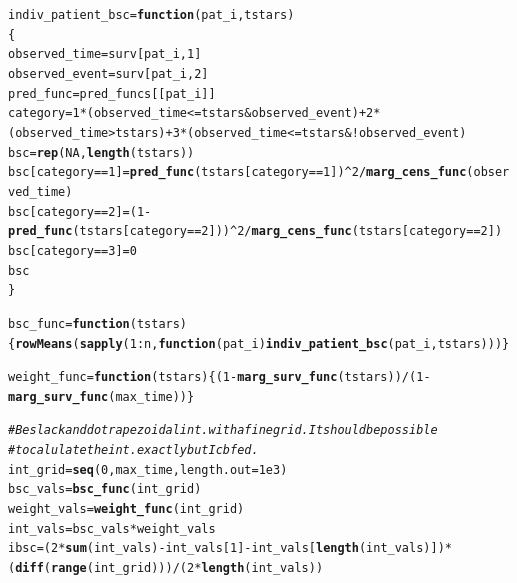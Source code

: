 \documentclass{article}\usepackage[]{graphicx}\usepackage[]{color}
\makeatletter
\newcommand{\hlnum}[1]{\textcolor[rgb]{0.686,0.059,0.569}{#1}}%
\newcommand{\hlcom}[1]{\textcolor[rgb]{0.678,0.584,0.686}{\textit{#1}}}%
\newcommand{\hlopt}[1]{\textcolor[rgb]{0,0,0}{#1}}%
\newcommand{\hlstd}[1]{\textcolor[rgb]{0.345,0.345,0.345}{#1}}%
\newcommand{\hlkwa}[1]{\textcolor[rgb]{0.161,0.373,0.58}{\textbf{#1}}}%
\newcommand{\hlkwb}[1]{\textcolor[rgb]{0.69,0.353,0.396}{#1}}%
\newcommand{\hlkwc}[1]{\textcolor[rgb]{0.333,0.667,0.333}{#1}}%
\newcommand{\hlkwd}[1]{\textcolor[rgb]{0.737,0.353,0.396}{\textbf{#1}}}%
\newenvironment{kframe}{%
 \def\at@end@of@kframe{}%
 \ifinner\ifhmode%
  \def\at@end@of@kframe{\end{minipage}}%
  \begin{minipage}{\columnwidth}%
 \fi\fi%
 \def\FrameCommand##1{\hskip\@totalleftmargin \hskip-\fboxsep
 \colorbox{shadecolor}{##1}\hskip-\fboxsep
     \hskip-\linewidth \hskip-\@totalleftmargin \hskip\columnwidth}%
 \MakeFramed {\advance\hsize-\width
   \@totalleftmargin\z@ \linewidth\hsize
   \@setminipage}}%
 {\par\unskip\endMakeFramed%
 \at@end@of@kframe}
\newenvironment{knitrout}{}{} %
\makeatother
\begin{document}
\begin{knitrout}
\begin{kframe}
\begin{alltt}
        \hlstd{indiv_patient_bsc} \hlkwb{=} \hlkwa{function}\hlstd{(}\hlkwc{pat_i}\hlstd{,} \hlkwc{tstars}\hlstd{)}
        \hlstd{\{}
                \hlstd{observed_time} \hlkwb{=} \hlstd{surv[pat_i,} \hlnum{1}\hlstd{]}
                \hlstd{observed_event} \hlkwb{=} \hlstd{surv[pat_i,} \hlnum{2}\hlstd{]}
                \hlstd{pred_func} \hlkwb{=} \hlstd{pred_funcs[[pat_i]]}
                \hlstd{category} \hlkwb{=} \hlnum{1}\hlopt{*}\hlstd{(observed_time} \hlopt{<=} \hlstd{tstars} \hlopt{&} \hlstd{observed_event)} \hlopt{+} \hlnum{2}\hlopt{*}\hlstd{(observed_time} \hlopt{>} \hlstd{tstars)} \hlopt{+} \hlnum{3}\hlopt{*}\hlstd{(observed_time} \hlopt{<=} \hlstd{tstars} \hlopt{& !}\hlstd{observed_event)}
                \hlstd{bsc} \hlkwb{=} \hlkwd{rep}\hlstd{(}\hlnum{NA}\hlstd{,} \hlkwd{length}\hlstd{(tstars))}
                \hlstd{bsc[category} \hlopt{==} \hlnum{1}\hlstd{]} \hlkwb{=} \hlkwd{pred_func}\hlstd{(tstars[category} \hlopt{==} \hlnum{1}\hlstd{])}\hlopt{^}\hlnum{2} \hlopt{/} \hlkwd{marg_cens_func}\hlstd{(observed_time)}
                \hlstd{bsc[category} \hlopt{==} \hlnum{2}\hlstd{]} \hlkwb{=} \hlstd{(}\hlnum{1} \hlopt{-} \hlkwd{pred_func}\hlstd{(tstars[category} \hlopt{==} \hlnum{2}\hlstd{]))}\hlopt{^}\hlnum{2} \hlopt{/} \hlkwd{marg_cens_func}\hlstd{(tstars[category} \hlopt{==} \hlnum{2}\hlstd{])}
                \hlstd{bsc[category} \hlopt{==} \hlnum{3}\hlstd{]} \hlkwb{=} \hlnum{0}
                \hlstd{bsc}
        \hlstd{\}}

        \hlstd{bsc_func} \hlkwb{=} \hlkwa{function}\hlstd{(}\hlkwc{tstars}\hlstd{) \{} \hlkwd{rowMeans}\hlstd{(}\hlkwd{sapply}\hlstd{(}\hlnum{1}\hlopt{:}\hlstd{n,} \hlkwa{function}\hlstd{(}\hlkwc{pat_i}\hlstd{)} \hlkwd{indiv_patient_bsc}\hlstd{(pat_i, tstars))) \}}

        \hlstd{weight_func} \hlkwb{=} \hlkwa{function}\hlstd{(}\hlkwc{tstars}\hlstd{) \{ (}\hlnum{1} \hlopt{-} \hlkwd{marg_surv_func}\hlstd{(tstars))} \hlopt{/} \hlstd{(}\hlnum{1} \hlopt{-} \hlkwd{marg_surv_func}\hlstd{(max_time)) \}}

        \hlcom{# Be slack and do trapezoidal int. with a fine grid.  It should be possible }
        \hlcom{# to calulate the int. exactly but I cbfed.}
        \hlstd{int_grid} \hlkwb{=} \hlkwd{seq}\hlstd{(}\hlnum{0}\hlstd{, max_time,} \hlkwc{length.out} \hlstd{=} \hlnum{1e3}\hlstd{)}
        \hlstd{bsc_vals} \hlkwb{=} \hlkwd{bsc_func}\hlstd{(int_grid)}
        \hlstd{weight_vals} \hlkwb{=} \hlkwd{weight_func}\hlstd{(int_grid)}
        \hlstd{int_vals} \hlkwb{=} \hlstd{bsc_vals} \hlopt{*} \hlstd{weight_vals}
        \hlstd{ibsc} \hlkwb{=} \hlstd{(}\hlnum{2}\hlopt{*}\hlkwd{sum}\hlstd{(int_vals)} \hlopt{-} \hlstd{int_vals[}\hlnum{1}\hlstd{]} \hlopt{-} \hlstd{int_vals[}\hlkwd{length}\hlstd{(int_vals)])} \hlopt{*} \hlstd{(}\hlkwd{diff}\hlstd{(}\hlkwd{range}\hlstd{(int_grid)))} \hlopt{/} \hlstd{(}\hlnum{2}\hlopt{*}\hlkwd{length}\hlstd{(int_vals))}


\end{alltt}
\end{kframe}
\end{knitrout}
\end{document}
